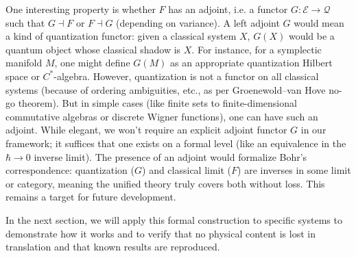 
\medskip

One interesting property is whether $F$ has an adjoint, i.e. a functor $G:  \to {}$ such that $G \dashv F$ or $F \dashv G$ (depending on variance). A left adjoint $G$ would mean a kind of quantization functor: given a classical system $X$, $G(X)$ would be a quantum object whose classical shadow is $X$. For instance, for a symplectic manifold $M$, one might define $G(M)$ as an appropriate quantization Hilbert space or $C^*$-algebra. However, quantization is not a functor on all classical systems (because of ordering ambiguities, etc., as per Groenewold–van Hove no-go theorem). But in simple cases (like finite sets to finite-dimensional commutative algebras or discrete Wigner functions), one can have such an adjoint. While elegant, we won't require an explicit adjoint functor $G$ in our framework; it suffices that one exists on a formal level (like an equivalence in the $\hbar{}$ inverse limit). The presence of an adjoint would formalize Bohr's correspondence: quantization ($G$) and classical limit ($F$) are inverses in some limit or category, meaning the unified theory truly covers both without loss. This remains a target for future development.

\medskip

In the next section, we will apply this formal construction to specific systems to demonstrate how it works and to verify that no physical content is lost in translation and that known results are reproduced.